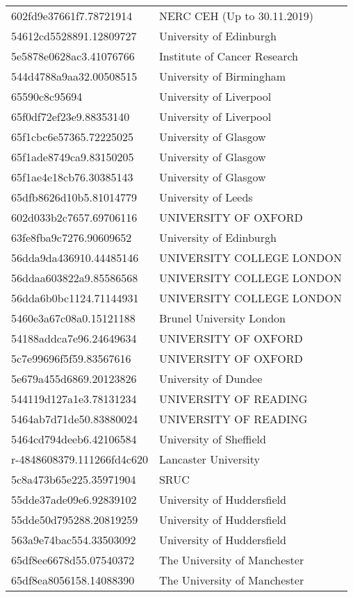 \begin{tabular}{ll}
602fd9e37661f7.78721914 & NERC CEH (Up to 30.11.2019) \\
54612cd5528891.12809727 & University of Edinburgh \\
5e5878e0628ac3.41076766 & Institute of Cancer Research \\
544d4788a9aa32.00508515 & University of Birmingham \\
65590c8c95694 & University of Liverpool \\
65f0df72ef23e9.88353140 & University of Liverpool \\
65f1cbc6e57365.72225025 & University of Glasgow \\
65f1ade8749ca9.83150205 & University of Glasgow \\
65f1ae4e18cb76.30385143 & University of Glasgow \\
65dfb8626d10b5.81014779 & University of Leeds \\
602d033b2c7657.69706116 & UNIVERSITY OF OXFORD \\
63fe8fba9c7276.90609652 & University of Edinburgh \\
56dda9da436910.44485146 & UNIVERSITY COLLEGE LONDON \\
56ddaa603822a9.85586568 & UNIVERSITY COLLEGE LONDON \\
56dda6b0bc1124.71144931 & UNIVERSITY COLLEGE LONDON \\
5460e3a67c08a0.15121188 & Brunel University London \\
54188addca7e96.24649634 & UNIVERSITY OF OXFORD \\
5c7e99696f5f59.83567616 & UNIVERSITY OF OXFORD \\
5e679a455d6869.20123826 & University of Dundee \\
544119d127a1e3.78131234 & UNIVERSITY OF READING \\
5464ab7d71de50.83880024 & UNIVERSITY OF READING \\
5464cd794deeb6.42106584 & University of Sheffield \\
r-4848608379.111266fd4c620 & Lancaster University \\
5c8a473b65e225.35971904 & SRUC \\
55dde37ade09e6.92839102 & University of Huddersfield \\
55dde50d795288.20819259 & University of Huddersfield \\
563a9e74bac554.33503092 & University of Huddersfield \\
65df8ee6678d55.07540372 & The University of Manchester \\
65df8ea8056158.14088390 & The University of Manchester \\

\end{tabular}
